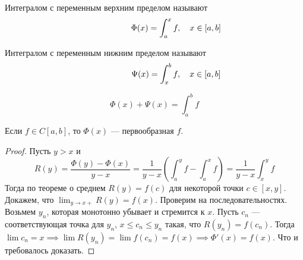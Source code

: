 \begin{conj}
    Интегралом с переменным верхним пределом называют
    \begin{equation*}
      \hphantom{, \quad x \in [a, b]}
      \Phi(x) = \int_{a}^{x} f
      , \quad x \in [a, b]
    \end{equation*}
\end{conj}

\begin{conj}
    Интегралом с переменным нижним пределом называют
    \begin{equation*}
      \hphantom{, \quad x \in [a, b]}
      \Psi(x) = \int_{x}^{b} f
      , \quad x \in [a, b]
    \end{equation*}
\end{conj}

\begin{notice}
    \begin{equation*}
      \Phi(x) + \Psi(x) = \int_{a}^{b} f
    \end{equation*}
\end{notice}

\begin{theorem}[Барроу]
    Если $f \in C[a, b]$, то $\Phi(x)$ --- первообразная $f$.
\end{theorem}
\begin{proof}
    Пусть $y > x$ и
    \begin{equation*}
      R(y) = \frac{\Phi(y) - \Phi(x)}{y - x} = \frac{1}{y - x}\left(\int_{a}^{y} f - \int_{a}^{x} f\right) = \frac{1}{y - x}\int_{x}^{y} f
    \end{equation*}
    Тогда по теореме о среднем $R(y) = f(c)$ для некоторой точки $c \in [x, y]$. Докажем, что $\lim_{y \to x+} R(y) = f(x)$. Проверим на последовательностях. Возьмем $y_n$, которая монотонно убывает и стремится к $x$. Пусть $c_n$ --- соответствующая точка для $y_n$,\; $x \leq c_n \leq y_n$ такая, что $R(y_n) = f(c_n)$. Тогда $\lim c_n = x \implies \lim R(y_n) = \lim f(c_n) = f(x) \implies \Phi'(x) = f(x)$. Что и требовалось доказать.
\end{proof}

